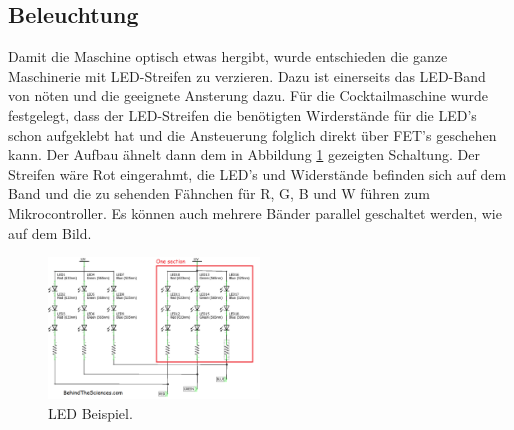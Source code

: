 \subsection{Beleuchtung}
\label{subsec:Beleuchtung}

Damit die Maschine optisch etwas hergibt, wurde entschieden die ganze Maschinerie mit LED-Streifen zu verzieren. Dazu ist einerseits das LED-Band von nöten und die geeignete Ansterung dazu. Für die Cocktailmaschine wurde festgelegt, dass der LED-Streifen die benötigten Wirderstände für die LED's schon aufgeklebt hat und die Ansteuerung folglich direkt über FET's geschehen kann. Der Aufbau ähnelt dann dem in Abbildung \ref{fig:LED1} gezeigten Schaltung. Der Streifen wäre Rot eingerahmt, die LED's und Widerstände befinden sich auf dem Band und die zu sehenden Fähnchen für R, G, B und W führen zum Mikrocontroller. Es können auch mehrere Bänder parallel geschaltet werden, wie auf dem Bild.

\begin{figure}[h!]
\center
\includegraphics[width = 0.5\textwidth]{graphics/Schema_LED1}
\caption{LED Beispiel.}
\label{fig:LED1}
\end{figure}
